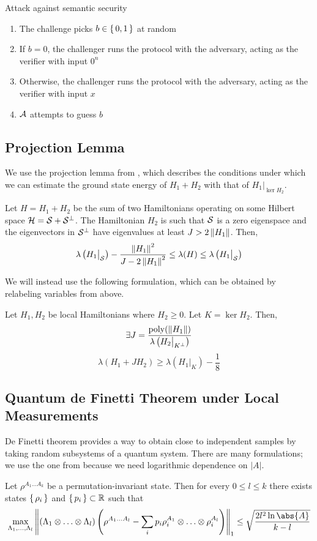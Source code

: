 \begin{protocol}{Attack against semantic security}
	\label{proto:indcpa}
	\begin{enumerate}
		\item The challenge picks $b\in\set{0,1}$ at random
		\item If $b=0$, the challenger runs the protocol with the adversary, acting as the verifier with input $0^n$
		\item Otherwise, the challenger runs the protocol with the adversary, acting as the verifier with input $x$
		\item $\mathcal{A}$ attempts to guess $b$
	\end{enumerate}
\end{protocol}

\subsection{Projection Lemma}

We use the projection lemma from \cite{kempe_kitaev_regev_2006}, which describes the conditions under which we can estimate the ground state energy of $H_1 + H_2$ with that of $H_1\big|_{\ker H_2}$.

\begin{thm}
	Let $H=H_1+H_2$ be the sum of two Hamiltonians operating on some Hilbert space $\mathcal{H}=\mathcal{S}+\mathcal{S}^\bot$.
	The Hamiltonian $H_2$ is such that $\mathcal{S}$ is a zero eigenspace and the eigenvectors in $\mathcal{S}^\bot$ have eigenvalues at least $J>2\left\lVert H_1\right\rVert$. Then,
	$$\lambda\left(H_1\big|_{\mathcal{S}}\right)-\frac{\left\lVert H_1\right\rVert^2}{J-2\left\lVert H_1\right\rVert^2}\leq\lambda(H)\leq\lambda\left(H_1\big|_{\mathcal{S}}\right)$$
\end{thm}

We will instead use the following formulation, which can be obtained by relabeling variables from above.

\begin{thm}
	\label{thm:projection}
	Let $H_1, H_2$ be local Hamiltonians where $H_2\geq0$. Let $K=\ker H_2$. Then,
	$$\exists J=\frac{\operatorname*{\operatorname{poly}}(\left\lVert H_1\right\rVert)}{\lambda\left(H_2\big|_{K^\bot}\right)}$$
	$$\lambda(H_1+JH_2)\geq\lambda\left(H_1\big|_K\right)-\frac{1}{8}$$
\end{thm}

\subsection{Quantum de Finetti Theorem under Local Measurements}

De Finetti theorem provides a way to obtain close to independent samples by taking random subsystems of a quantum system.
There are many formulations; we use the one from \cite{Brandão2017} because we need logarithmic dependence on $|A|$.
\begin{thm}
	\label{deFinetti}
	Let $\rho^{A_1\ldots A_k}$ be a permutation-invariant state. Then for every $0\leq l\leq k$ there exists states $\set{\rho_i}$ and $\set{p_i}\subset\mathbb{R}$ such that
	$$\max_{\Lambda_1,\ldots,\Lambda_l}\norm{(\Lambda_1\otimes\ldots\otimes\Lambda_l)\left(\rho^{A_1\ldots A_l}-\sum_ip_i\rho_i^{A_1}\otimes\ldots\otimes\rho_i^{A_l}\right)}_1\leq\sqrt{\frac{2l^2\ln\abs{A}}{k-l}}$$
\end{thm}

